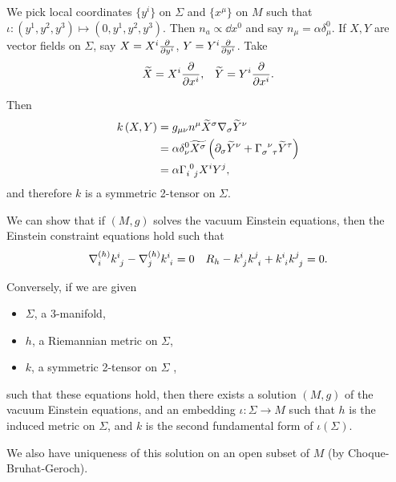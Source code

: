 We pick local coordinates $\{y^{i}\} $ on $\Sigma$ and $\{x^{\mu}\}$ on $M$ such that $\iota : \left( y^{1}, y^{2}, y^{3} \right) \mapsto \left( 0,y^{1}, y^{2}, y^{3} \right) $. Then $n_a \propto \dd{x}^{0}$ and say $n_\mu = \alpha \delta^{0}_\mu$. If $X,Y$ are vector fields on $\Sigma$, say $X = X^{i} \pdv{y^{i}}$, $Y = Y^{i} \pdv{y^{i}}$. Take
\begin{align}
    \widetilde{X} = X^{i} \pdv{x^{i}}, && \widetilde{Y} = Y^{i} \pdv{x^{i}}
.\end{align}

Then
\begin{align}
    k \left( X,Y \right) &= g_{\mu \nu} n^{\mu} \widetilde{X}^{\sigma} \nabla_\sigma \widetilde{Y}^{\nu} \\
    &= \alpha \delta^{0}_\nu \widetilde{X^{\sigma}} \left( \partial_\sigma \widetilde{Y}^{\nu} + \tensor{\Gamma}{_{\sigma}^{\nu}_\tau} \widetilde{Y}^{\tau} \right)  \\
    &= \alpha \tensor{\Gamma}{_{i}^{0}_{j}} X^{i} Y^{j}
,\end{align}
and therefore $k$ is a symmetric 2-tensor on $\Sigma$. 

We can show that if $\left( M,g \right) $ solves the vacuum Einstein equations, then the Einstein constraint equations hold such that
\begin{align}
    \nabla_{i}^{\left( h \right) } \tensor{k}{^{i}_j} - \nabla_j^{\left( h \right) } \tensor{k}{^{i}_i} = 0 && R_h - \tensor{k}{^{i}_j} \tensor{k}{^{j}_i} + \tensor{k}{^{i}_i} \tensor{k}{^{j}_j} = 0
.\end{align}

Conversely, if we are given
\begin{itemize}
    \item $\Sigma$, a 3-manifold,
    \item $h$, a Riemannian metric on $\Sigma$,
    \item $k$, a symmetric 2-tensor on $\Sigma$
,\end{itemize}
such that these equations hold, then there exists a solution $\left( M,g \right) $ of the vacuum Einstein equations, and an embedding $\iota : \Sigma \to M$ such that $h$ is the induced metric on $\Sigma$, and $k$ is the second fundamental form of $\iota \left( \Sigma \right) $.

We also have uniqueness of this solution on an open subset of $M$ (by Choque-Bruhat-Geroch).

